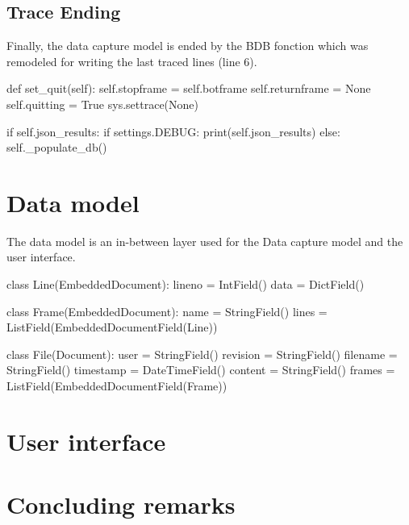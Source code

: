 \subsection{Trace Ending}

Finally, the data capture model is ended by the  BDB fonction which was remodeled for writing the last traced lines (line 6).
\begin{python}
def set_quit(self):
    self.stopframe = self.botframe
    self.returnframe = None
    self.quitting = True
    sys.settrace(None)

    if self.json_results:
        if settings.DEBUG:
            print(self.json_results)
        else:
            self._populate_db()
\end{python}



\section{Data model}
The data model is an in-between layer used for the Data capture model and the user interface.

\begin{python}
class Line(EmbeddedDocument):
    lineno = IntField()
    data = DictField()
\end{python}
\begin{python}
class Frame(EmbeddedDocument):
    name = StringField()
    lines = ListField(EmbeddedDocumentField(Line))
\end{python}
\begin{python}
class File(Document):
    user = StringField()
    revision = StringField()
    filename = StringField()
    timestamp = DateTimeField()
    content = StringField()
    frames = ListField(EmbeddedDocumentField(Frame))
\end{python}
\section{User interface}

\section{Concluding remarks}
